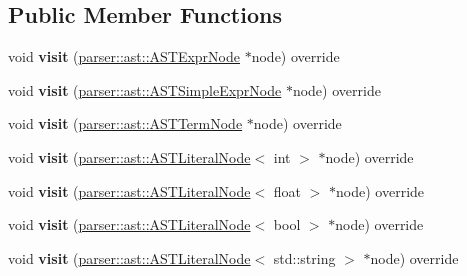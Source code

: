 \subsection*{Public Member Functions}
\begin{DoxyCompactItemize}
\item 
\mbox{\label{classvisitor_1_1TypeCheckVisitor_aec4ad72e42bc34b577a572ba86aefec2}} 
void {\bfseries visit} (\hyperlink{classparser_1_1ast_1_1ASTExprNode}{parser\+::ast\+::\+A\+S\+T\+Expr\+Node} $\ast$node) override
\item 
\mbox{\label{classvisitor_1_1TypeCheckVisitor_a8d7f1a19314471061a645de2cfca53be}} 
void {\bfseries visit} (\hyperlink{classparser_1_1ast_1_1ASTSimpleExprNode}{parser\+::ast\+::\+A\+S\+T\+Simple\+Expr\+Node} $\ast$node) override
\item 
\mbox{\label{classvisitor_1_1TypeCheckVisitor_a5265a68e6f20e4de224044ef6d5156c4}} 
void {\bfseries visit} (\hyperlink{classparser_1_1ast_1_1ASTTermNode}{parser\+::ast\+::\+A\+S\+T\+Term\+Node} $\ast$node) override
\item 
\mbox{\label{classvisitor_1_1TypeCheckVisitor_a1da13df9f4a67246e4fab28590b4ce3b}} 
void {\bfseries visit} (\hyperlink{classparser_1_1ast_1_1ASTLiteralNode}{parser\+::ast\+::\+A\+S\+T\+Literal\+Node}$<$ int $>$ $\ast$node) override
\item 
\mbox{\label{classvisitor_1_1TypeCheckVisitor_afd12a2144b14553195c594cc163fc4ca}} 
void {\bfseries visit} (\hyperlink{classparser_1_1ast_1_1ASTLiteralNode}{parser\+::ast\+::\+A\+S\+T\+Literal\+Node}$<$ float $>$ $\ast$node) override
\item 
\mbox{\label{classvisitor_1_1TypeCheckVisitor_abaa1ff6899f3bd7156a613dee01fad37}} 
void {\bfseries visit} (\hyperlink{classparser_1_1ast_1_1ASTLiteralNode}{parser\+::ast\+::\+A\+S\+T\+Literal\+Node}$<$ bool $>$ $\ast$node) override
\item 
\mbox{\label{classvisitor_1_1TypeCheckVisitor_a41e215d0be02b7532375d9d4a70c95d8}} 
void {\bfseries visit} (\hyperlink{classparser_1_1ast_1_1ASTLiteralNode}{parser\+::ast\+::\+A\+S\+T\+Literal\+Node}$<$ std\+::string $>$ $\ast$node) override

\end{DoxyCompactItemize}
